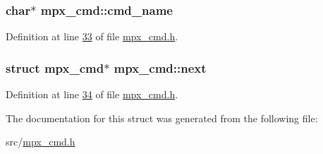 \hypertarget{structmpx__cmd_aeae73296151ffcec319820f4d8399e51}{
\subsubsection[{cmd\_\-name}]{\setlength{\rightskip}{0pt plus 5cm}char$\ast$ {\bf mpx\_\-cmd::cmd\_\-name}}}
\label{structmpx__cmd_aeae73296151ffcec319820f4d8399e51}


Definition at line \hyperlink{mpx__cmd_8h_source_l00033}{33} of file \hyperlink{mpx__cmd_8h_source}{mpx\_\-cmd.h}.

\hypertarget{structmpx__cmd_a863c991d0d31b283791615b5f5fe03bb}{
\subsubsection[{next}]{\setlength{\rightskip}{0pt plus 5cm}struct {\bf mpx\_\-cmd}$\ast$ {\bf mpx\_\-cmd::next}}}
\label{structmpx__cmd_a863c991d0d31b283791615b5f5fe03bb}


Definition at line \hyperlink{mpx__cmd_8h_source_l00034}{34} of file \hyperlink{mpx__cmd_8h_source}{mpx\_\-cmd.h}.



The documentation for this struct was generated from the following file:\begin{DoxyCompactItemize}
\item 
src/\hyperlink{mpx__cmd_8h}{mpx\_\-cmd.h}\end{DoxyCompactItemize}
